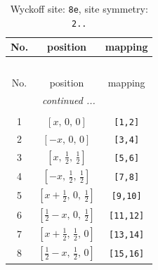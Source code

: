 \documentclass[fleqn,8pt]{jsarticle}
\begin{document}
\renewcommand{\arraystretch}{1.2}
\begin{longtable}{ccc}
\caption{Wyckoff site: {\tt 8e}, site symmetry: {\tt 2..}}
 \\
 \hline \hline
No. & position & mapping \\ \hline \endfirsthead

\multicolumn{2}{l}{\tablename\ \thetable{}} \\
 \hline \hline
No. & position & mapping \\ \hline \endhead

 \hline \hline
\multicolumn{2}{r}{\footnotesize\it continued ...} \\ \endfoot

 \hline \hline
\multicolumn{2}{r}{} \\ \endlastfoot

1 & $\left[ x,\, 0,\, 0 \right]$ & {\tt [1,2]} \\ \hline
2 & $\left[ - x,\, 0,\, 0 \right]$ & {\tt [3,4]} \\ \hline
3 & $\left[ x,\, \frac{1}{2},\, \frac{1}{2} \right]$ & {\tt [5,6]} \\ \hline
4 & $\left[ - x,\, \frac{1}{2},\, \frac{1}{2} \right]$ & {\tt [7,8]} \\ \hline
5 & $\left[ x + \frac{1}{2},\, 0,\, \frac{1}{2} \right]$ & {\tt [9,10]} \\ \hline
6 & $\left[ \frac{1}{2} - x,\, 0,\, \frac{1}{2} \right]$ & {\tt [11,12]} \\ \hline
7 & $\left[ x + \frac{1}{2},\, \frac{1}{2},\, 0 \right]$ & {\tt [13,14]} \\ \hline
8 & $\left[ \frac{1}{2} - x,\, \frac{1}{2},\, 0 \right]$ & {\tt [15,16]} \\
\end{longtable}
\renewcommand{\arraystretch}{1.2}
\end{document}
